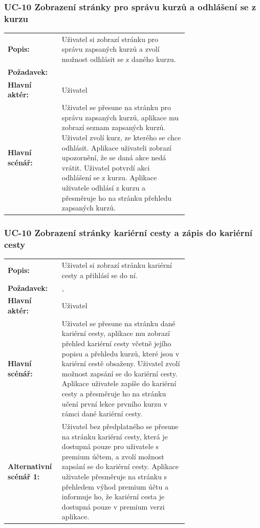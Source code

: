\subsubsection{UC-10 Zobrazení stránky pro správu kurzů a odhlášení se z kurzu}

\begin{tabular}{lp{0.7\linewidth}}
  \textbf{Popis:} & Uživatel si zobrazí stránku pro správu zapsaných kurzů a zvolí možnost odhlásit se z daného kurzu. \\
  \textbf{Požadavek:} & \nameref{sec:fp-course-management} \\
  \textbf{Hlavní aktér:} & Uživatel \\
  \textbf{Hlavní scénář:} & Uživatel se přesune na stránku pro správu zapsaných kurzů, aplikace mu zobrazí seznam zapsaných kurzů. Uživatel zvolí kurz, ze kterého se chce odhlásit. Aplikace uživateli zobrazí upozornění, že se daná akce nedá vrátit. Uživatel potvrdí akci odhlášení se z kurzu. Aplikace uživatele odhlásí z kurzu a přesměruje ho na stránku přehledu zapsaných kurzů. \\
\end{tabular}


\subsubsection{UC-10 Zobrazení stránky kariérní cesty a zápis do kariérní cesty}

\begin{tabular}{lp{0.7\linewidth}}
  \textbf{Popis:} & Uživatel si zobrazí stránku kariérní cesty a přihlásí se do ní. \\
  \textbf{Požadavek:} & \nameref{sec:fp-learning-paths}, \nameref{sec:fp-subscription-system} \\
  \textbf{Hlavní aktér:} & Uživatel \\
  \textbf{Hlavní scénář:} & Uživatel se přesune na stránku dané kariérní cesty, aplikace mu zobrazí přehled kariérní cesty včetně jejího popisu a přehledu kurzů, které jsou v kariérní cestě obsaženy. Uživatel zvolí možnost zapsání se do kariérní cesty. Aplikace uživatele zapíše do kariérní cesty a přesměruje ho na stránku učení první lekce prvního kurzu v rámci dané kariérní cesty. \\
  \textbf{Alternativní scénář 1:} & Uživatel bez předplatného se přesune na stránku kariérní cesty, která je dostupná pouze pro uživatele s premium účtem, a zvolí možnost zapsání se do kariérní cesty. Aplikace uživatele přesměruje na stránku s přehledem výhod premium účtu a informuje ho, že kariérní cesta je dostupná pouze v premium verzi aplikace. \\
\end{tabular}

